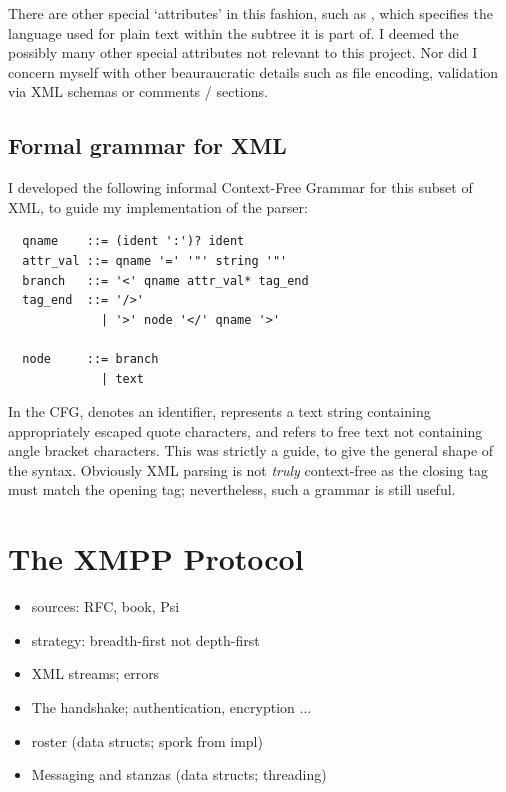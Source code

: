 \documentclass[12pt,a4paper,twoside,openright]{report}
\begin{document}
{There are other special `attributes' in this fashion, such as , which specifies the language used for plain text within the subtree it is part of. I deemed the possibly many other special attributes not relevant to this project. Nor did I concern myself with other beauraucratic details such as file encoding, validation via XML schemas or comments /  sections.

\subsection{Formal grammar for XML}
I developed the following informal Context-Free Grammar for this subset of XML, to guide my implementation of the parser:

\begin{minipage}{\linewidth}
  \begin{lstlisting}
  qname    ::= (ident ':')? ident
  attr_val ::= qname '=' '"' string '"'
  branch   ::= '<' qname attr_val* tag_end
  tag_end  ::= '/>'
             | '>' node '</' qname '>'

  node     ::= branch
             | text

  \end{lstlisting}
\end{minipage}

In the CFG,  denotes an identifier,  represents a text string containing appropriately escaped quote characters, and  refers to free text not containing angle bracket characters. This was strictly a guide, to give the general shape of the syntax. Obviously XML parsing is not \emph{truly} context-free as the closing tag must match the opening tag; nevertheless, such a grammar is still useful.

\section{The XMPP Protocol}
\begin{itemize}
  \item sources: RFC, book, Psi
  \item strategy: breadth-first not depth-first
  \item XML streams; errors
  \item The handshake; authentication, encryption ...
  \item roster (data structs; spork from impl)
  \item Messaging and stanzas (data structs; threading)
\end{itemize}
}
\end{document}

